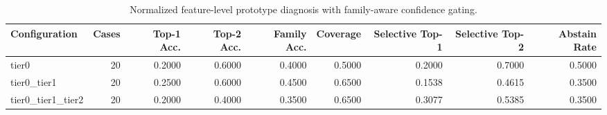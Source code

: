 \begin{table}[t]
\centering
\caption{Normalized feature-level prototype diagnosis with family-aware confidence gating.}
\label{tab:dice_stressor_hierarchical_diagnosis}
\footnotesize
\begin{tabular}{lrrrrrrrr}
\toprule
Configuration & Cases & Top-1 Acc. & Top-2 Acc. & Family Acc. & Coverage & Selective Top-1 & Selective Top-2 & Abstain Rate \\
\midrule
tier0 & 20 & 0.2000 & 0.6000 & 0.4000 & 0.5000 & 0.2000 & 0.7000 & 0.5000 \\
tier0_tier1 & 20 & 0.2500 & 0.6000 & 0.4500 & 0.6500 & 0.1538 & 0.4615 & 0.3500 \\
tier0_tier1_tier2 & 20 & 0.2000 & 0.4000 & 0.3500 & 0.6500 & 0.3077 & 0.5385 & 0.3500 \\
\bottomrule
\end{tabular}

\end{table}
